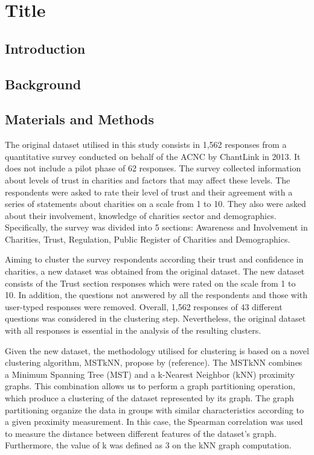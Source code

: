 \documentclass{article}
\begin{document}
\section{Title}

\subsection{Introduction}

\subsection{Background}

\subsection{Materials and Methods}

The original dataset utilised in this study consists in 1,562 responses from a
quantitative survey conducted on behalf of the ACNC by ChantLink in 2013. It
does not include a pilot phase of 62 responses. The survey collected information
about levels of trust in charities and factors that may affect these levels. The
respondents were asked to rate their level of trust and their agreement with a
series of statements about charities on a scale from 1 to 10. They also were
asked about their involvement, knowledge of charities sector and demographics.
Specifically, the survey was divided into 5 sections: Awareness and Involvement
in Charities, Trust, Regulation, Public Register of Charities and Demographics.

Aiming to cluster the survey respondents according their trust and confidence in
charities, a new dataset was obtained from the original dataset. The new dataset
consists of the Trust section responses which were rated on the scale from 1 to
10. In addition, the questions not answered by all the respondents and those
with user-typed responses were removed. Overall, 1,562 responses of 43
different questions was considered in the clustering step. Nevertheless, the
original dataset with all responses is essential in the analysis of the
resulting clusters.

Given the new dataset, the methodology utilised for clustering is based on a
novel clustering algorithm, MSTkNN, propose by (reference). The MSTkNN combines
a Minimum Spanning Tree (MST) and a k-Nearest Neighbor (kNN) proximity graphs.
This combination allows us to perform a graph partitioning operation, which
produce a clustering of the dataset represented by its graph. The graph
partitioning organize the data in groups with similar characteristics according
to a given proximity measurement. In this case, the Spearman correlation was
used to measure the distance between different features of the dataset's graph.
Furthermore, the value of k was defined as 3 on the kNN graph computation. 
\end{document}
